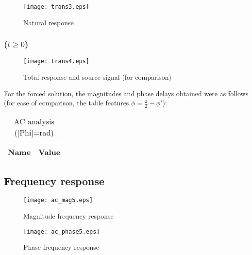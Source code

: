 \begin{figure}[H]
  \centering
  \texttt{[image: trans3.eps]}
  \caption{Natural response}
  \label{fig:nat_sim}
\end{figure}

\subsubsection{($ t \geq 0$)}

\begin{figure}[H]
  \centering
  \texttt{[image: trans4.eps]}
  \caption{Total response and source signal (for comparison)}
  \label{fig:tot:sim}
\end{figure}

For the forced solution, the magnitudes and phase delays obtained were as follows (for ease of comparison, the table features $\phi = \frac{\pi}{2} - \phi'$):

\begin{table}[H]
	\centering
	\begin{tabular}{|l|c|}
		\hline    
		    {\bf Name} & {\bf Value} \\
                    \hline
                    \hline
		
	\end{tabular}
	\caption{AC analysis ([Phi]=rad)}
	\label{tab:op1}
\end{table}

\subsection{Frequency response}

\begin{figure}[H]
  \centering
  \texttt{[image: ac\_mag5.eps]}
  \caption{Magnitude frequency response}
  \label{freq_resp_mag_sim}
\end{figure}

\begin{figure}[H]
  \centering
  \texttt{[image: ac\_phase5.eps]}
  \caption{Phase frequency response}
  \label{freq_resp_pha_sim}
\end{figure}
